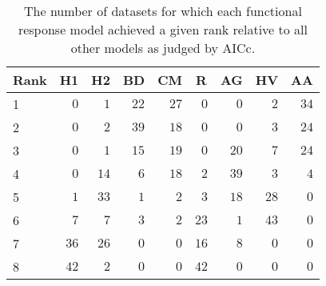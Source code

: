 \begin{table}[!tbp]
\caption{The number of datasets for which each functional response model achieved a given rank relative to all other models as judged by AICc.\label{table:AICc_rankings}} 
\begin{center}
\begin{tabular}{lrrrrrrrr}
\hline\hline
\multicolumn{1}{l}{Rank}&\multicolumn{1}{c}{H1}&\multicolumn{1}{c}{H2}&\multicolumn{1}{c}{BD}&\multicolumn{1}{c}{CM}&\multicolumn{1}{c}{R}&\multicolumn{1}{c}{AG}&\multicolumn{1}{c}{HV}&\multicolumn{1}{c}{AA}\tabularnewline
\hline
1&$ 0$&$ 1$&$22$&$27$&$ 0$&$ 0$&$ 2$&$34$\tabularnewline
2&$ 0$&$ 2$&$39$&$18$&$ 0$&$ 0$&$ 3$&$24$\tabularnewline
3&$ 0$&$ 1$&$15$&$19$&$ 0$&$20$&$ 7$&$24$\tabularnewline
4&$ 0$&$14$&$ 6$&$18$&$ 2$&$39$&$ 3$&$ 4$\tabularnewline
5&$ 1$&$33$&$ 1$&$ 2$&$ 3$&$18$&$28$&$ 0$\tabularnewline
6&$ 7$&$ 7$&$ 3$&$ 2$&$23$&$ 1$&$43$&$ 0$\tabularnewline
7&$36$&$26$&$ 0$&$ 0$&$16$&$ 8$&$ 0$&$ 0$\tabularnewline
8&$42$&$ 2$&$ 0$&$ 0$&$42$&$ 0$&$ 0$&$ 0$\tabularnewline
\hline
\end{tabular}\end{center}
\end{table}
